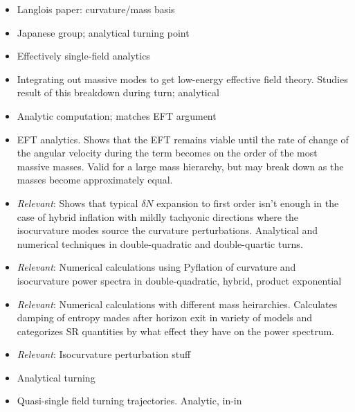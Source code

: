 \documentclass[11pt]{article}
\begin{document}
\begin{itemize}

  \item  Langlois paper: curvature/mass basis \cite{Gao:2013ota}

  \item  Japanese group; analytical turning point \cite{Noumi:2013cfa}

  \item Effectively single-field analytics \cite{Noumi:2012vr}

  \item Integrating out massive modes to get low-energy effective field theory.  Studies result of this breakdown during turn; analytical \cite{Gao:2012uq}

  \item Analytic computation; matches EFT argument \cite{Pi:2012gf}

  \item EFT analytics.  Shows that the EFT remains viable until the rate of change of the angular velocity during the term becomes on the order of the most massive masses.  Valid for a large mass hierarchy, but may break down as the masses become approximately equal.  \cite{Cespedes:2012hu}

  \item \emph{Relevant}: Shows that typical $\delta N$ expansion to first order isn't enough in the case of hybrid inflation with mildly tachyonic directions where the isocurvature modes source the curvature perturbations.  Analytical and numerical techniques in double-quadratic and double-quartic turns. \cite{Avgoustidis:2011em}

  \item \emph{Relevant}: Numerical calculations using Pyflation of curvature and isocurvature power spectra in double-quadratic, hybrid, product exponential \cite{Huston:2011fr}

  \item \emph{Relevant}: Numerical calculations with different mass heirarchies.  Calculates damping of entropy mades after horizon exit in variety of models and categorizes SR quantities by what effect they have on the power spectrum. \cite{Peterson:2010np}

  \item \emph{Relevant}: Isocurvature perturbation stuff \cite{Huston:2011fr,Gordon:2000hv}

  \item Analytical turning \cite{Achucarro:2010da}

  \item Quasi-single field turning trajectories.  Analytic, in-in \cite{Chen:2009zp,Chen:2009we}

\end{itemize}






\end{document}
